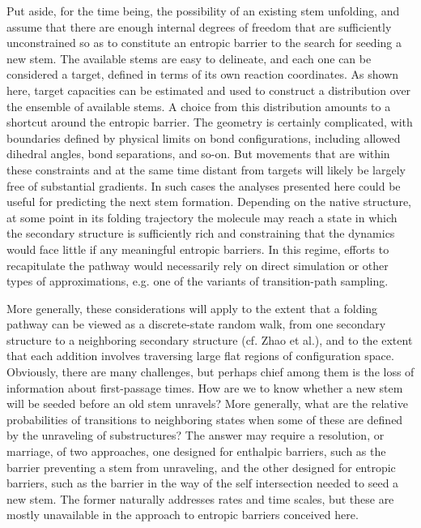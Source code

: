 \documentclass[12pt, nofootinbib,english, amsmath, amssymb, aps, priprint, graphicx,floatfix]{revtex4-1}
\theoremstyle{plain}
\theoremstyle{definition}
\theoremstyle{plain}
\begin{document}
Put aside, for the time being, the possibility of an existing stem unfolding, and assume that there are enough internal degrees of freedom that are sufficiently unconstrained so as to constitute an entropic barrier to the search for seeding a new stem. The available stems are easy to delineate, and each one can be considered a target, defined in terms of its own reaction coordinates. As shown here, target capacities can be estimated and used to construct a distribution over the ensemble of available stems. A choice from this distribution amounts to a shortcut around the entropic barrier. The geometry is certainly complicated, with boundaries defined by physical limits on bond configurations, including allowed dihedral angles, bond separations, and so-on. But movements that are within these constraints and at the same time distant from targets will likely be largely free of substantial gradients. In such cases the analyses presented here could be useful for predicting the next stem formation. 
Depending on the native structure, at some point in its folding trajectory the molecule may reach a state in which the secondary structure is sufficiently rich and constraining that the dynamics would face
little if any meaningful entropic barriers. In this regime, efforts to recapitulate the pathway would necessarily rely on direct simulation or other types of approximations, e.g. one of the variants of transition-path sampling.

More generally, these considerations will apply to the extent that a folding pathway can be viewed as 
a discrete-state random walk, from one secondary structure to a neighboring secondary structure (cf. Zhao et al.\cite{Zhao2010-zipping}),
and to the extent that each addition involves traversing large flat regions of configuration space. Obviously, there are many challenges, but perhaps chief among them is the loss of information about first-passage times. How are we to know whether a new stem will be seeded before an old stem unravels? More generally, what are the relative probabilities of transitions to neighboring states when some of these are defined by the unraveling of substructures? The answer may require a resolution, or marriage, of two approaches, one designed for enthalpic barriers, such as the barrier preventing a stem from unraveling, and the other designed for entropic barriers, such as the barrier in the way of the self intersection needed to seed a new stem. The former naturally addresses rates and time scales, but these are mostly unavailable in the approach to entropic barriers conceived here.
\end{document}
